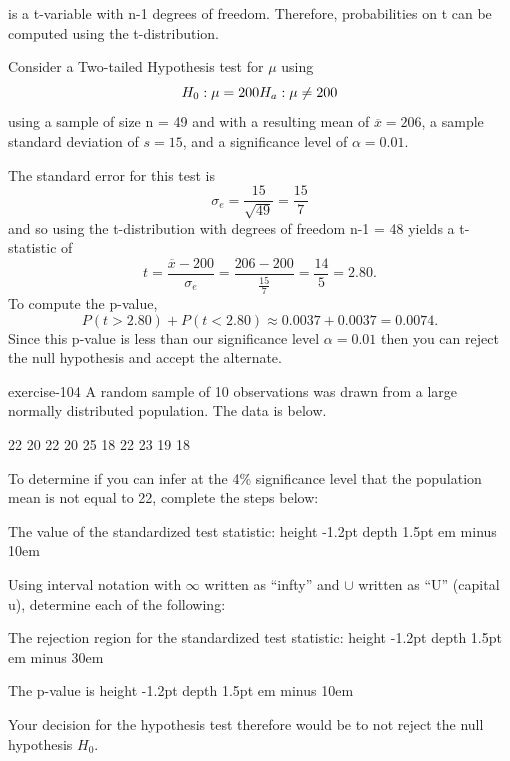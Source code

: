 \documentclass[10pt,]{book}
\newcommand{\fillin}[1]{\leavevmode\leaders\vrule height -1.2pt depth 1.5pt \hskip #1em minus #1em \null}
\numberwithin{equation}{section}
\newcommand{\lt}{<}
\newcommand{\gt}{>}
\begin{document}
is a t-variable with n-1 degrees of freedom. Therefore, probabilities on t can be computed using the t-distribution.%
\par
\hypertarget{p-1466}{}%
Consider a Two-tailed Hypothesis test for \(\mu\) using%
\begin{equation*}
H_0 : \mu = 200 \\ H_a: \mu \neq 200
\end{equation*}
using a sample of size n = 49 and with a resulting mean of \(\overline{x} = 206\), a sample standard deviation of \(s = 15\), and a significance level of \(\alpha = 0.01\).%
\par
\hypertarget{p-1467}{}%
The standard error for this test is%
\begin{equation*}
\sigma_e = \frac{15}{\sqrt{49}} = \frac{15}{7}
\end{equation*}
and so using the t-distribution with degrees of freedom n-1 = 48 yields a t-statistic of%
\begin{equation*}
t = \frac{\overline{x} - 200}{\sigma_e} = \frac{206-200}{\frac{15}{7}} = \frac{14}{5} = 2.80.
\end{equation*}
To compute the p-value,%
\begin{equation*}
P(t \gt 2.80) + P(t \lt 2.80) \approx 0.0037 + 0.0037 = 0.0074.
\end{equation*}
Since this p-value is less than our significance level \(\alpha = 0.01\) then you can reject the null hypothesis and accept the alternate.%
\par
\hypertarget{p-1468}{}%
\begin{inlineexercise}{}{exercise-104}%
\hypertarget{p-1477}{}%
A random sample of 10 observations was drawn from a large normally distributed population. The data is below.%
\par
\hypertarget{p-1478}{}%
22 20 22 20 25 18 22 23 19 18%
\par
\hypertarget{p-1479}{}%
To determine if you can infer at the 4\% significance level that the population mean is not equal to 22, complete the steps below:%
\par
\hypertarget{p-1480}{}%
The value of the standardized test statistic:  \fillin{10}%
\par
\hypertarget{p-1481}{}%
Using interval notation with \(\infty\) written as ``infty'' and \(\cup\) written as ``U'' (capital u), determine each of the following:%
\par
\hypertarget{p-1482}{}%
The rejection region for the standardized test statistic:  \fillin{30}%
\par
\hypertarget{p-1483}{}%
The p-value is  \fillin{10}%
\par
\hypertarget{p-1484}{}%
Your decision for the hypothesis test therefore would be to not reject the null hypothesis \(H_0\text{.}\)%
\end{inlineexercise}
\end{document}
